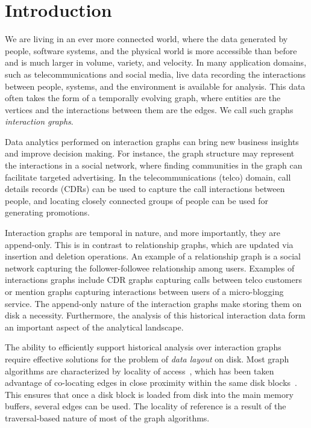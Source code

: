 \section{Introduction}\label{sec:introduction}

We are living in an ever more connected world, where the data generated by
people, software systems, and the physical world is more accessible than
before and is much larger in volume, variety, and velocity. In many
application domains, such as telecommunications and social media, live data
recording the interactions between people, systems, and the environment is
available for analysis. This data often takes the form of a temporally
evolving graph, where entities are the vertices and the interactions between
them are the edges. We call such graphs \emph{interaction graphs}. 

Data analytics performed on interaction graphs can bring new business insights
and improve decision making. For instance, the graph structure may represent
the interactions in a social network, where finding communities in the graph
can facilitate targeted advertising. In the telecommunications (telco) domain,
call details records (CDRs) can be used to capture the call interactions
between people, and locating closely connected groups of people can be used
for generating promotions. 

Interaction graphs are temporal in nature, and more importantly, they are
append-only. This is in contrast to relationship graphs, which are updated via
insertion and deletion operations. An example of a relationship graph is a
social network capturing the follower-followee relationship among users.
Examples of interactions graphs include CDR graphs capturing calls between
telco customers or mention graphs capturing interactions between users of a
micro-blogging service. The append-only nature of the interaction graphs make
storing them on disk a necessity. Furthermore, the analysis of this historical
interaction data form an important aspect of the analytical landscape.

The ability to efficiently support historical analysis over interaction graphs
require effective solutions for the problem of \emph{data layout} on disk.
Most graph algorithms are characterized by locality of
access~\cite{localityLayout}, which has been taken advantage of co-locating
edges in close proximity within the same disk blocks~\cite{gstoreThesis}. This
ensures that once a disk block is loaded from disk into the main memory
buffers, several edges can be used. The locality of reference is a result of
the traversal-based nature of most of the graph algorithms. 

